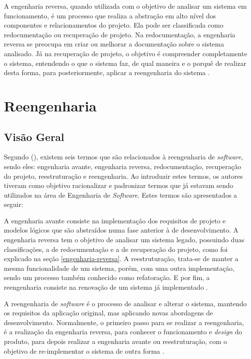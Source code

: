 A engenharia reversa, quando utilizada com o objetivo de analisar um sistema em funcionamento, é um processo que 
realiza a abstração em alto nível dos componentes e relacionamentos do projeto. Ela pode ser classificada como 
redocumentação ou recuperação de projeto. Na redocumentação, a engenharia reversa se preocupa em criar ou melhorar a documentação 
sobre o sistema analisado. Já na recuperação de projeto, o objetivo é compreender completamente o sistema, entendendo o que o 
sistema faz, de qual maneira e o porquê de realizar desta forma, para posteriormente, aplicar a reengenharia do sistema \cite{cagnin2005parfait}.

\section{Reengenharia}
\label{sectionReengenharia}

\subsection{Visão Geral}

Segundo  (\citeyear{chikofsky1990reverse}), existem seis termos que são relacionados à reengenharia de \textit{software}, sendo eles: engenharia 
avante, engenharia reversa, redocumentação, recuperação do projeto, reestruturação e reengenharia. Ao introduzir estes 
termos, os autores tiveram como objetivo racionalizar e padronizar termos que já estavam sendo utilizados na área de 
Engenharia de \textit{Software}. Estes termos são apresentados a seguir:

A engenharia avante consiste na implementação dos requisitos de projeto e modelos lógicos que são abstraídos 
numa fase anterior à de desenvolvimento. A engenharia reversa tem o objetivo de analisar um sistema legado, possuindo 
duas classificações, a de redocumentação e a de recuperação do projeto, como foi explicado na seção \ref{engenharia-reversa}. 
A reestruturação, trata-se de manter a mesma funcionalidade de um sistema, porém, com uma outra implementação, sendo 
um processo também conhecido como refatoração. E por fim, a reengenharia consiste na renovação de um sistema já implementado \cite{chikofsky1990reverse}.

A reengenharia de \textit{software} é o processo de analisar e alterar o sistema, mantendo os requisitos da aplicação original, 
mas aplicando novas abordagens de desenvolvimento. Normalmente, o primeiro passo para se realizar a reengenharia, é a 
realização da engenharia reversa, para conhecer o funcionamento e \textit{design} do produto, para depois realizar a engenharia 
avante ou reestruturação, com o objetivo de re-implementar o sistema de outra forma \cite{cagnin2005parfait}.

